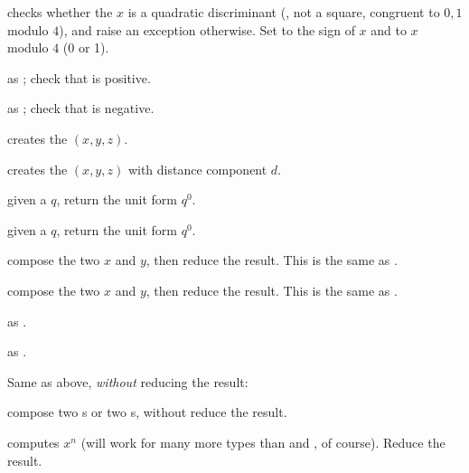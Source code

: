 
checks whether the  $x$ is a quadratic discriminant (,
not a square, congruent to $0,1$ modulo $4$), and raise an exception
otherwise. Set  to the sign of $x$ and  to $x$ modulo
$4$ (0 or 1).

 as
; check that  is positive.

 as
; check that  is negative.


 creates the  $(x,y,z)$.

 creates the  $(x,y,z)$
with distance component $d$.

 given a  $q$, return the unit form $q^0$.

 given a  $q$, return the unit form $q^0$.


 compose the two  $x$ and $y$,
then reduce the result. This is the same as .

 compose the two  $x$ and $y$,
then reduce the result. This is the same as .

 as .

 as .

\noindent Same as above, \emph{without} reducing the result:





 compose two s or two s,
without reduce the result.


 computes $x^n$ (will work for many more types
than  and , of course). Reduce the result.

